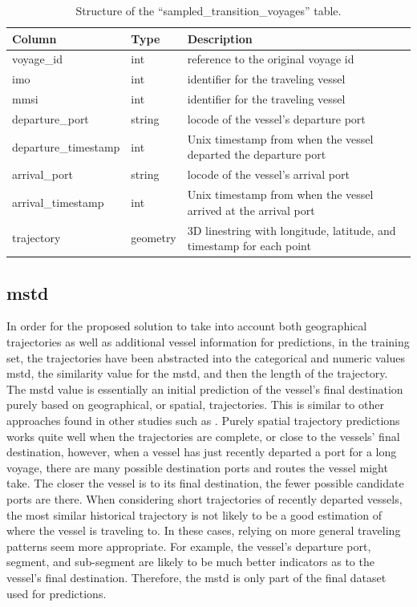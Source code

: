 \begin{table}[htbp]
    \centering
    \small{\begin{tabularx}{1.0\textwidth}{p{1.3in} p{0.75in} X}
        \bfseries{Column} & \bfseries{Type} & \bfseries{Description} \\ \toprule
        voyage\_id & int & reference to the original voyage id \\ \midrule
        imo & int & identifier for the traveling vessel\\ \midrule
        mmsi & int & identifier for the traveling vessel\\ \midrule
        departure\_port & string & \gls{locode} of the vessel's departure port \\ \midrule
        departure\_timestamp & int & Unix timestamp from when the vessel departed the departure port \\ \midrule
        arrival\_port & string & \gls{locode} of the vessel's arrival port \\ \midrule
        arrival\_timestamp & int & Unix timestamp from when the vessel arrived at the arrival port \\ \midrule
        trajectory & geometry & 3D linestring with longitude, latitude, and timestamp for each point \\ \bottomrule
    \end{tabularx}}
\caption{Structure of the ``sampled\_transition\_voyages'' table.}\label{tab:sampled_voyages}
\end{table}

\subsection{\acrfull{mstd}}

In order for the proposed solution to take into account both geographical trajectories as well as additional vessel information for predictions, in the training set, the trajectories have been abstracted into the categorical and numeric values \acrfull{mstd}, the similarity value for the \acrshort{mstd}, and then the length of the trajectory. The \acrshort{mstd} value is essentially an initial prediction of the vessel's final destination purely based on geographical, or spatial, trajectories. This is similar to other approaches found in other studies such as \cite{Zhang2020AISApproach}. Purely spatial trajectory predictions works quite well when the trajectories are complete, or close to the vessels' final destination, however, when a vessel has just recently departed a port for a long voyage, there are many possible destination ports and routes the vessel might take. The closer the vessel is to its final destination, the fewer possible candidate ports are there. When considering short trajectories of recently departed vessels, the most similar historical trajectory is not likely to be a good estimation of where the vessel is traveling to. In these cases, relying on more general traveling patterns seem more appropriate. For example, the vessel's departure port, segment, and sub-segment are likely to be much better indicators as to the vessel's final destination. Therefore, the \acrshort{mstd} is only part of the final dataset used for predictions.


